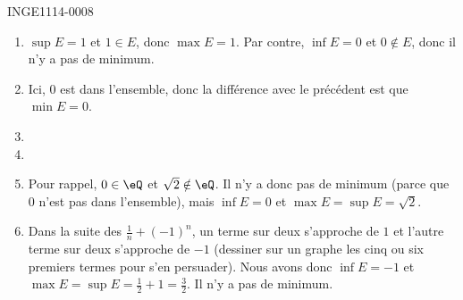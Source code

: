 

\begin{corrige}{INGE1114-0008}

	\begin{enumerate}

		\item
			$\sup E=1$ et $1\in E$, donc $\max E=1$. Par contre, $\inf E=0$ et $0\notin E$, donc il n'y a pas de minimum.
		\item
			Ici, $0$ est dans l'ensemble, donc la différence avec le précédent est que $\min E=0$. 
		\item
		\item
		\item
			Pour rappel, $0\in\eQ$ et $\sqrt{2}\notin\eQ$. Il n'y a donc pas de minimum (parce que $0$ n'est pas dans l'ensemble), mais $\inf E=0$ et $\max E=\sup E=\sqrt{2}$.
		\item
			Dans la suite des $\frac{1}{ n }+(-1)^n$, un terme sur deux s'approche de $1$ et l'autre terme sur deux s'approche de $-1$ (dessiner sur un graphe les cinq ou six premiers termes pour s'en persuader). Nous avons donc $\inf E=-1$ et $\max E=\sup E=\frac{1}{ 2 }+1=\frac{ 3 }{ 2 }$. Il n'y a pas de minimum.

	\end{enumerate}

\end{corrige}
